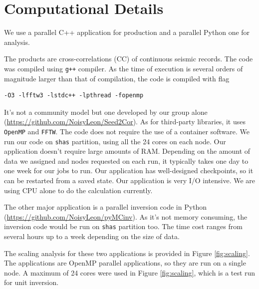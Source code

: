 \documentclass[10pt, letterpaper]{article}
\begin{document}
\section{Computational Details}\label{sec:method}

We use a parallel C++ application for production
and a parallel Python one for analysis.

The products are cross-correlations (CC) of continuous seismic records.
The code was compiled using \lstinline{g++} compiler.
As the time of execution is several orders of magnitude
larger than that of compilation, the code is compiled with flag

\begin{lstlisting}
-O3 -lfftw3 -lstdc++ -lpthread -fopenmp
\end{lstlisting}

It's not a community model but one developed by our group alone (\url{https://github.com/NoisyLeon/Seed2Cor}). As for third-party libraries, it uses \lstinline{OpenMP} and \lstinline{FFTW}. The code does not require the use of a container software. We run our code on \lstinline{shas} partition, using all the 24 cores on each node. Our application doesn't require large amounts of RAM. Depending on the amount of data we assigned and nodes requested on each run, it typically takes one day to one week for our jobs to run. Our application has well-designed checkpoints, so it can be restarted from a saved state. Our application is very I/O intensive.
We are using CPU alone to do the calculation currently.

The other major application is a parallel inversion code in Python
(\url{https://github.com/NoisyLeon/pyMCinv}).
As it's not memory consuming, the inversion code would be run on \lstinline{shas} partition too. The time cost ranges from several hours up to a week depending on the size of data.

The scaling analysis for these two applications is provided in Figure \ref{fig:scaling}.
The applications are OpenMP parallel applications, so they are run on a single node.
A maximum of 24 cores were used in Figure \ref{fig:scaling},
which is a test run for unit inversion.
\end{document}
